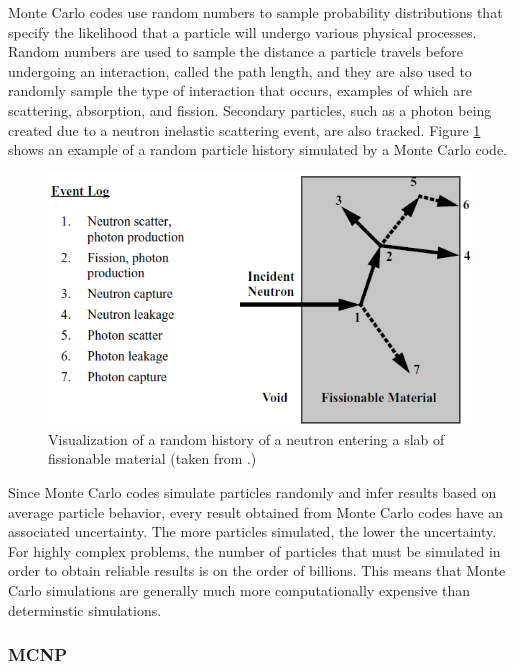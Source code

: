 Monte Carlo codes use random numbers to sample probability distributions that specify the likelihood that a particle will undergo various physical processes.
Random numbers are used to sample the distance a particle travels before undergoing an interaction, called the path length, and they are also used to randomly sample the type of interaction that occurs, examples of which are scattering, absorption, and fission.
Secondary particles, such as a photon being created due to a neutron inelastic scattering event, are also tracked.
Figure \ref{fig:bg:monte-carlo} shows an example of a random particle history simulated by a Monte Carlo code. 

\begin{figure}[h!]
  \centering
  \includegraphics[width=1.0\textwidth]{content/background/monte_carlo.png}
  \caption{Visualization of a random history of a neutron entering a slab of fissionable material (taken from \cite{mcnp5_vol1}.)}
  \label{fig:bg:monte-carlo}
\end{figure}

Since Monte Carlo codes simulate particles randomly and infer results based on average particle behavior, every result obtained from Monte Carlo codes have an associated uncertainty.
The more particles simulated, the lower the uncertainty.
For highly complex problems, the number of particles that must be simulated in order to obtain reliable results is on the order of billions.
This means that Monte Carlo simulations are generally much more computationally expensive than determinstic simulations.

\subsubsection{MCNP}
\label{sec:bg:rt:mc:mcnp}

